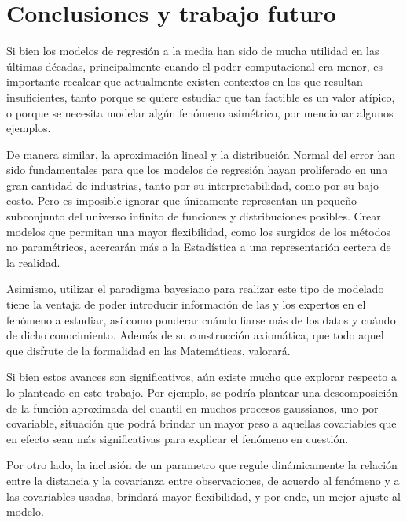 \chapter[Conclusiones y trabajo futuro]{Conclusiones y trabajo futuro}

Si bien los modelos de regresi\'on a la media han sido de mucha utilidad en las \'ultimas d\'ecadas, principalmente cuando el poder computacional era menor, es importante recalcar que actualmente existen contextos en los que resultan insuficientes, tanto porque se quiere estudiar que tan factible es un valor at\'ipico, o porque se necesita modelar alg\'un fen\'omeno asim\'etrico, por mencionar algunos ejemplos.

De manera similar, la aproximaci\'on lineal y la distribuci\'on Normal del error han sido fundamentales para que los modelos de regresi\'on hayan proliferado en una gran cantidad de industrias, tanto por su interpretabilidad, como por su bajo costo. Pero es imposible ignorar que \'unicamente representan un pequeño subconjunto del universo infinito de funciones y distribuciones posibles. Crear modelos que permitan una mayor flexibilidad, como los surgidos de los m\'etodos no param\'etricos, acercar\'an m\'as a la Estad\'istica a una representaci\'on certera de la realidad.

Asimismo, utilizar el paradigma bayesiano para realizar este tipo de modelado tiene la ventaja de poder introducir informaci\'on de las y los expertos en el fen\'omeno a estudiar, as\'i como ponderar cu\'ando fiarse m\'as de los datos y cu\'ando de dicho conocimiento. Adem\'as de su construcci\'on axiom\'atica, que todo aquel que disfrute de la formalidad en las Matem\'aticas, valorar\'a.

Si bien estos avances son significativos, a\'un existe mucho que explorar respecto a lo planteado en este trabajo. Por ejemplo, se podr\'ia plantear una descomposici\'on de la funci\'on aproximada del cuantil en muchos procesos gaussianos, uno por covariable, situaci\'on que podr\'a brindar un mayor peso a aquellas covariables que en efecto sean m\'as significativas para explicar el fen\'omeno en cuesti\'on. 

Por otro lado, la inclusi\'on de un parametro que regule din\'amicamente la relaci\'on entre la distancia y la covarianza entre observaciones, de acuerdo al fen\'omeno y a las covariables usadas, brindar\'a mayor flexibilidad, y por ende, un mejor ajuste al modelo.

\newpage 